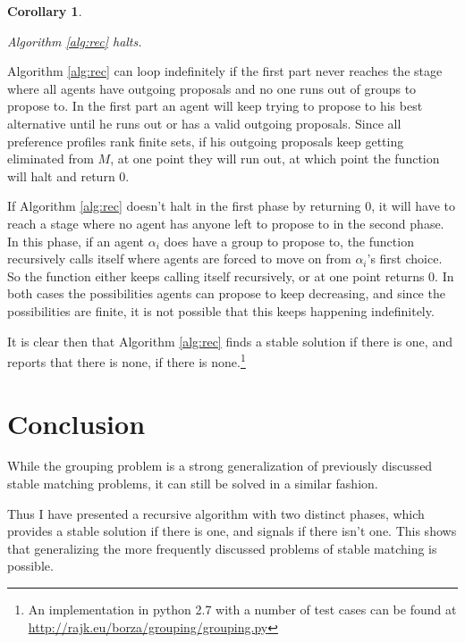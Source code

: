 \documentclass{elsarticle}
\newtheorem{mysta}{Corollary}
\begin{document}
\begin{mysta}
\label{sta:halt}

Algorithm \ref{alg:rec} halts.

\end{mysta}

Algorithm \ref{alg:rec} can loop indefinitely if the first part never reaches the stage where all agents have outgoing proposals and no one runs out of groups to propose to. In the first part an agent will keep trying to propose to his best alternative until he runs out or has a valid outgoing proposals. Since all preference profiles rank finite sets, if his outgoing proposals keep getting eliminated from $M$, at one point they will run out, at which point the function will halt and return 0.

If Algorithm \ref{alg:rec} doesn't halt in the first phase by returning 0, it will have to reach a stage where no agent has anyone left to propose to in the second phase. In this phase, if an agent $\alpha_i$ does have a group to propose to, the function recursively calls itself where agents are forced to move on from $\alpha_i$'s first choice. So the function either keeps calling itself recursively, or at one point returns 0. In both cases the possibilities agents can propose to keep decreasing, and since the possibilities are finite, it is not possible that this keeps happening indefinitely. 

It is clear then that Algorithm \ref{alg:rec} finds a stable solution if there is one, and reports that there is none, if there is none.\footnote{An implementation in python 2.7 with a number of test cases can be found at \url{http://rajk.eu/borza/grouping/grouping.py}}

\section{Conclusion}

While the grouping problem is a strong generalization of previously discussed stable matching problems, it can still be solved in a similar fashion. 

Thus I have presented a recursive algorithm with two distinct phases, which provides a stable solution if there is one, and signals if there isn't one. This shows that generalizing the more frequently discussed problems of stable matching is possible.
\end{document}
